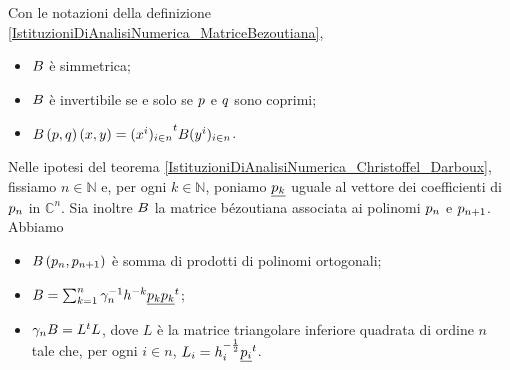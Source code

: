 \begin{Theorem}
	Con le notazioni della definizione \ref{IstituzioniDiAnalisiNumerica_MatriceBezoutiana},
	\begin{itemize}
		\item $B$ \`e simmetrica;
		\item $B$ \`e invertibile se e solo se $p$ e $q$ sono coprimi;
		\item $B \left ( p,q \right)(x,y) = {(x^i)_{i \in n}}^t B (y^i)_{i \in n}$.
	\end{itemize}
\end{Theorem}
\begin{Theorem}
	Nelle ipotesi del teorema \ref{IstituzioniDiAnalisiNumerica_Christoffel_Darboux}, fissiamo $n \in \mathbb{N}$ e, per ogni $k \in \mathbb{N}$, poniamo $\underline{p_k}$ uguale al vettore dei coefficienti di $p_n$ in $\mathbb{C}^n$. Sia inoltre $B$ la matrice b\'ezoutiana associata ai polinomi $p_n$ e $p_{n + 1}$. Abbiamo
	\begin{itemize}
		\item $B \left ( p_n,p_{n + 1} \right)$ \`e somma di prodotti di polinomi ortogonali;
		\item $B = \sum_{k = 1}^n \gamma_n^{-1} h^{-k} \underline{p_k} {\underline{p_k}}^t$;
		\item $\gamma_n B = {L}^tL$, dove $L$ \`e la matrice triangolare inferiore quadrata di ordine $n$ tale che, per ogni $i \in n$, $L_i = h_i^{-\frac{1}{2}} {\underline{p_i}}^t$.
	\end{itemize}
\end{Theorem}
